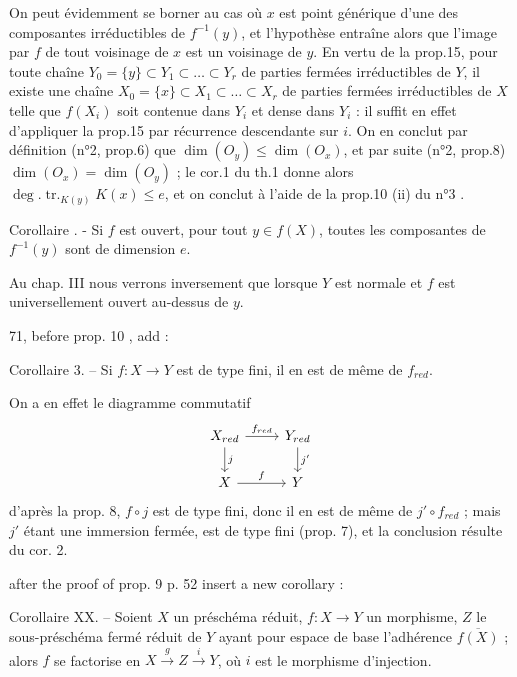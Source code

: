 On peut évidemment se borner au cas où $x$ est point générique d'une des composantes irréductibles de $f^{-1}(y)$, et l'hypothèse entraîne alors que l'image par $f$ de tout voisinage de $x$ est un voisinage de $y$. En vertu de la prop.15, pour toute chaîne $Y_0 = \{y\} \subset Y_1 \subset \dots \subset Y_r$ de parties fermées irréductibles de $Y$, il existe une chaîne $X_0 = \{x\} \subset X_1 \subset \dots \subset X_r$ de parties fermées irréductibles de $X$ telle que $f(X_i)$ soit contenue dans $Y_i$ et dense dans $Y_i$ : il suffit en effet d'appliquer la prop.15 par récurrence descendante sur $i$. On en conclut par définition (n°2, prop.6) que $\dim(O_y) \le \dim(O_x)$, et par suite (n°2, prop.8) $\dim(O_x) = \dim(O_y)$ ; le cor.1 du th.1 donne alors $\deg.\operatorname{tr.}_{K(y)} K(x) \le e$, et on conclut à l'aide de la prop.10 (ii) du n°3 .

\medskip
\noindent
Corollaire . - Si $f$ est ouvert, pour tout $y \in f(X)$, toutes les composantes de $f^{-1}(y)$ sont de dimension $e$.

Au chap. III nous verrons inversement que lorsque $Y$ est normale et $f$ est universellement ouvert au-dessus de $y$.


\newpage



71, before prop. 10 , add :

Corollaire 3. -- Si $f : X \to Y$ est de type fini, il en est de même de $f_{red}$.

On a en effet le diagramme commutatif
$$
\begin{tikzcd}
X_{red} \arrow[r, "f_{red}"] \arrow[d, "j"] & Y_{red} \arrow[d, "j'"] \\
X \arrow[r, "f"] & Y
\end{tikzcd}
$$
d'après la prop. 8, $f \circ j$ est de type fini, donc il en est de même de $j' \circ f_{red}$ ; mais $j'$ étant une immersion fermée, est de type fini (prop. 7), et la conclusion résulte du cor. 2.

after the proof of prop. 9
p. 52 insert a new corollary :

Corollaire XX. -- Soient $X$ un préschéma réduit, $f : X \to Y$ un morphisme, $Z$ le sous-préschéma fermé réduit de $Y$ ayant pour espace de base l'adhérence $\overline{f(X)}$ ; alors $f$ se factorise en $X \xrightarrow{g} Z \xrightarrow{i} Y$, où $i$ est le morphisme d'injection.

